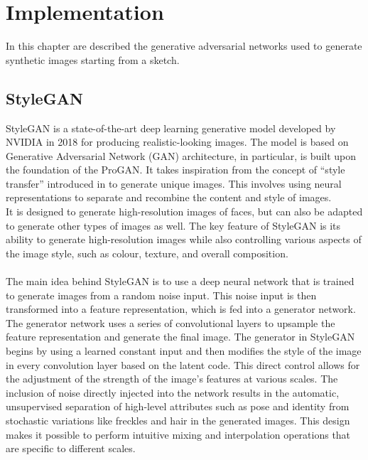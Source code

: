 \newpage
\section{Implementation}
\label{sec:used GAN discussion}
In this chapter are described the generative adversarial networks used to generate synthetic images starting from a sketch.
\subsection{StyleGAN}
\label{section:StyleGAN}
StyleGAN \cite{StyleGAN} is a state-of-the-art deep learning generative model developed by NVIDIA in 2018 for producing realistic-looking images. The model is based on Generative Adversarial Network (GAN) architecture, in particular, is built upon the foundation of the ProGAN. It takes inspiration from the concept of “style transfer” introduced in \cite{ImageStyleTransfer}  to generate unique images. This involves using neural representations to separate and recombine the content and style of images. \\
It is designed to generate high-resolution images of faces, but can also be adapted to generate other types of images as well. The key feature of StyleGAN is its ability to generate high-resolution images while also controlling various aspects of the image style, such as colour, texture, and overall composition. \\ \\
The main idea behind StyleGAN is to use a deep neural network that is trained to generate images from a random noise input. This noise input is then transformed into a feature representation, which is fed into a generator network. The generator network uses a series of convolutional layers to upsample the feature representation and generate the final image. The generator in StyleGAN begins by using a learned constant input and then modifies the style of the image in every convolution layer based on the latent code. This direct control allows for the adjustment of the strength of the image's features at various scales. The inclusion of noise directly injected into the network results in the automatic, unsupervised separation of high-level attributes such as pose and identity from stochastic variations like freckles and hair in the generated images. This design makes it possible to perform intuitive mixing and interpolation operations that are specific to different scales.

